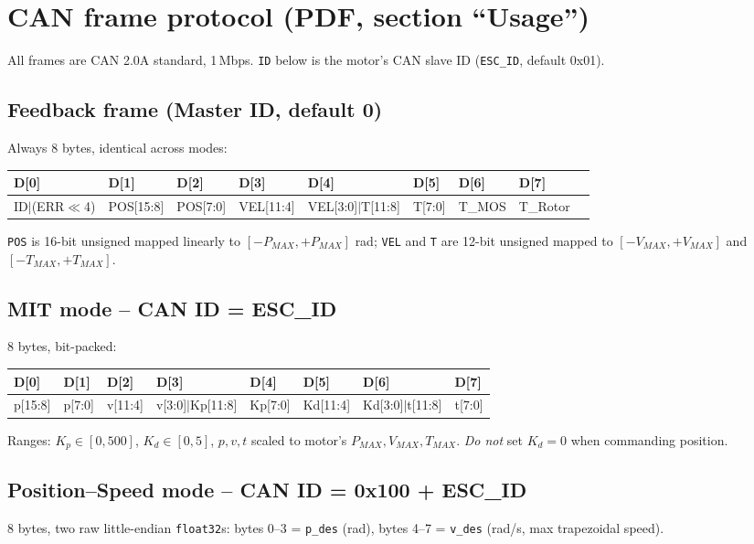 \documentclass[11pt,a4paper]{article}
\begin{document}
\section{CAN frame protocol (PDF, section ``Usage'')}
All frames are CAN 2.0A standard, 1\,Mbps. \texttt{ID} below is the motor's CAN
slave ID (\texttt{ESC\_ID}, default 0x01).

\subsection{Feedback frame (Master ID, default 0)}
Always 8 bytes, identical across modes:
\begin{center}\small
\begin{tabular}{lllllllll}
\toprule
D[0] & D[1] & D[2] & D[3] & D[4] & D[5] & D[6] & D[7] \\
\midrule
ID$|$(ERR$\!\ll\!$4) & POS[15:8] & POS[7:0] & VEL[11:4] & VEL[3:0]$|$T[11:8] & T[7:0] & T\_MOS & T\_Rotor \\
\bottomrule
\end{tabular}
\end{center}
\texttt{POS} is 16-bit unsigned mapped linearly to $[-P_{MAX}, +P_{MAX}]$ rad;
\texttt{VEL} and \texttt{T} are 12-bit unsigned mapped to $[-V_{MAX},+V_{MAX}]$
and $[-T_{MAX},+T_{MAX}]$.

\subsection{MIT mode -- CAN ID = ESC\_ID}
8 bytes, bit-packed:
\begin{center}\small
\begin{tabular}{llllllll}
\toprule
D[0] & D[1] & D[2] & D[3] & D[4] & D[5] & D[6] & D[7]\\
\midrule
p[15:8] & p[7:0] & v[11:4] & v[3:0]$|$Kp[11:8] & Kp[7:0] & Kd[11:4] & Kd[3:0]$|$t[11:8] & t[7:0]\\
\bottomrule
\end{tabular}
\end{center}
Ranges: $K_p\in[0,500]$, $K_d\in[0,5]$, $p,v,t$ scaled to motor's
$P_{MAX},V_{MAX},T_{MAX}$. \emph{Do not} set $K_d=0$ when commanding position.

\subsection{Position--Speed mode -- CAN ID = 0x100 + ESC\_ID}
8 bytes, two raw little-endian \texttt{float32}s: bytes 0--3 = \texttt{p\_des}
(rad), bytes 4--7 = \texttt{v\_des} (rad/s, max trapezoidal speed).
\end{document}
